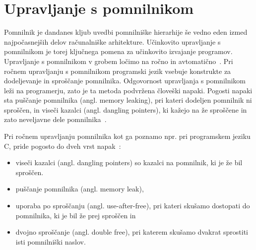 \section{Upravljanje s pomnilnikom}



Pomnilnik je dandanes kljub uvedbi pomnilniške hierarhije še vedno eden izmed najpočasnejših delov računalniške arhitekture. Učinkovito upravljanje s pomnilnikom je torej ključnega pomena za učinkovito izvajanje programov. Upravljanje s pomnilnikom v grobem ločimo na ročno in avtomatično~\cite{jones2023garbage}. Pri ročnem upravljanju s pomnilnikom programski jezik vsebuje konstrukte za dodeljevanje in sproščanje pomnilnika. Odgovornost upravljanja s pomnilnikom leži na programerju, zato je ta metoda podvržena človeški napaki. Pogosti napaki sta puščanje pomnilnika (angl. memory leaking), pri kateri dodeljen pomnilnik ni sproščen, in viseči kazalci (angl. dangling pointers), ki kažejo na že sproščene in zato neveljavne dele pomnilnika~\cite{jones2023garbage}.

Pri ročnem upravljanju pomnilnika kot ga poznamo npr. pri programskem jeziku C, pride pogosto do dveh vrst napak~\cite{jones2023garbage}:

\begin{itemize}
	\itemsep 0em
	\item viseči kazalci (angl. dangling pointers) so kazalci na pomnilnik, ki je že bil sproščen.
	\item puščanje pomnilnika (angl. memory leak), 
	\item uporaba po sproščanju (angl. use-after-free), pri kateri skušamo dostopati do pomnilnika, ki je bil že prej sproščen in
	\item dvojno sproščanje (angl. double free), pri katerem skušamo dvakrat sprostiti isti pomnilniški naslov.
\end{itemize}

